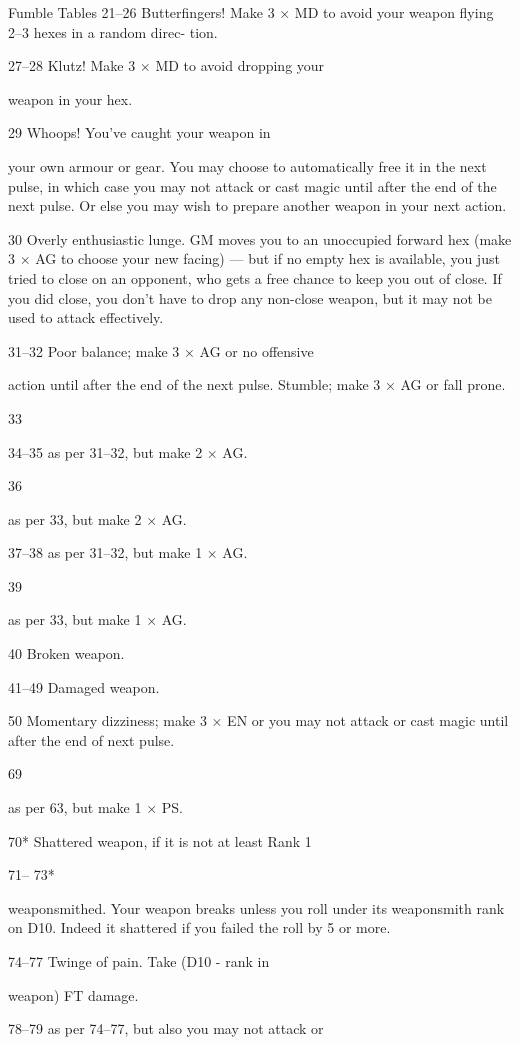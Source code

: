 \begin{Chapter}{Fumble Tables}
21–26  Butterfingers! Make 3 × MD to avoid your 
weapon flying 2–3 hexes in a random direc-
tion. 

27–28  Klutz! Make 3 × MD to avoid dropping your 

weapon in your hex. 

29   Whoops! You’ve caught your weapon in 

your own armour or gear. You may choose 
to automatically free it in the next pulse, in 
which case you may not attack or cast magic 
until after the end of the next pulse. Or else 
you may wish to prepare another weapon in 
your next action. 

30   Overly enthusiastic lunge. GM moves you to 
an unoccupied forward hex (make 3 × AG to 
choose your new facing) — but if no empty 
hex is available, you just tried to close on an 
opponent, who gets a free chance to keep 
you out of close. If you did close, you don’t 
have to drop any non-close weapon, but it 
may not be used to attack effectively. 

31–32  Poor balance; make 3 × AG or no offensive 

action until after the end of the next pulse. 
Stumble; make 3 × AG or fall prone. 

33  

34–35  as per 31–32, but make 2 × AG. 

36  

as per 33, but make 2 × AG. 

37–38  as per 31–32, but make 1 × AG. 

39  

as per 33, but make 1 × AG. 

40   Broken weapon. 

41–49  Damaged weapon. 

50   Momentary dizziness; make 3 × EN or you 
may not attack or cast magic until after the 
end of next pulse. 

69  

as per 63, but make 1 × PS. 

70*   Shattered weapon, if it is not at least Rank 1 

71–
73*  

weaponsmithed. 
Your weapon breaks unless you roll under 
its weaponsmith rank on D10. Indeed it 
shattered if you failed the roll by 5 or more. 

74–77  Twinge of pain. Take (D10 - rank in 

weapon) FT damage. 

78–79  as per 74–77, but also you may not attack or 


\end{Chapter}
